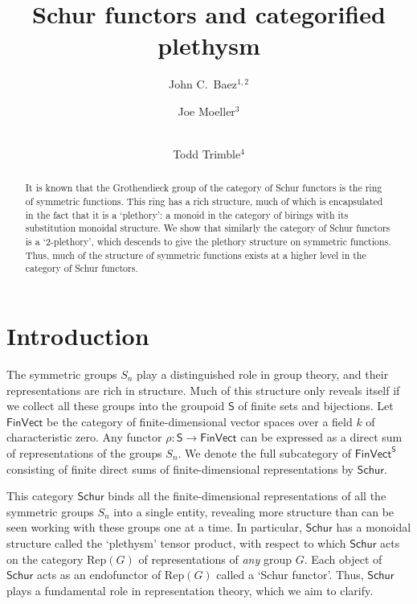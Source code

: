 \documentclass[12pt,reqno]{amsart}
\title[Schur functors and categorified plethysm]{Schur functors and categorified plethysm}
\author[Baez]{John C.\ Baez$^{1,2}$}
\author[Moeller]{Joe Moeller$^3$}
\author[Trimble]{\\Todd Trimble$^4$}
\theoremstyle{plain}
\theoremstyle{definition}
\theoremstyle{remark}
\newcommand{\maps}{\colon}
\newcommand{\category}[1]{\mathsf{#1}}
\renewcommand{\S}{\category S}
\newcommand{\namedcat}[1]{\mathsf{#1}}
\newcommand{\Schur}{\namedcat{Schur}}
\newcommand{\Vect}{\namedcat{Vect}}
\newcommand{\Fin}{\namedcat{Fin}}
\numberwithin{thm}{section}
\begin{document}
\begin{abstract}
It is known that the Grothendieck group of the category of Schur functors is the ring of symmetric functions. This ring has a rich structure, much of which is encapsulated in the fact that it is a `plethory': a monoid in the category of birings with its substitution monoidal structure. We show that similarly the category of Schur functors is a `2-plethory', which descends to give the plethory structure on symmetric functions. Thus, much of the structure of symmetric functions exists at a higher level in the category of Schur functors. 
\end{abstract}


\maketitle
\setcounter{tocdepth}{1} %
\tableofcontents

\section{Introduction}
\label{sec:intro}

The symmetric groups $S_n$ play a distinguished role in group theory, and their representations are rich in structure. Much of this structure only reveals itself if we collect all these groups into the groupoid $\S$ of finite sets and bijections. Let $\Fin\Vect$ be the category of finite-dimensional vector spaces over a field $k$ of characteristic zero. Any functor $\rho \maps \S \to \Fin\Vect$ can be expressed as a direct sum of representations of the groups $S_n$. We denote the full subcategory of $\Fin\Vect^\S$ consisting of finite direct sums of finite-dimensional representations by $\Schur$.

This category $\Schur$ binds all the finite-dimensional representations of all the symmetric groups $S_n$ into a single entity, revealing more structure than can be seen working with these groups one at a time. In particular, $\Schur$ has a monoidal structure called the `plethysm' tensor product, with respect to which $\Schur$ acts on the category $\mathrm{Rep}(G)$ of representations of \emph{any} group $G$. Each object of $\Schur$ acts as an endofunctor of $\mathrm{Rep}(G)$ called a  `Schur functor'. Thus, $\Schur$ plays a fundamental role in representation theory, which we aim to clarify.
\end{document}
